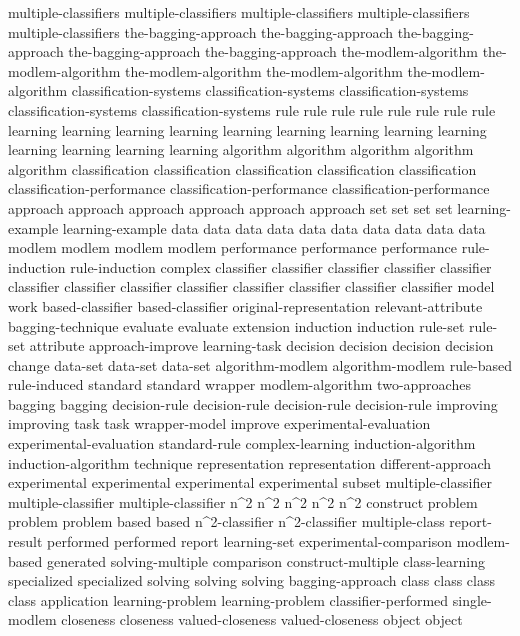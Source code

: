 multiple-classifiers	multiple-classifiers	multiple-classifiers	multiple-classifiers	multiple-classifiers	
the-bagging-approach	the-bagging-approach	the-bagging-approach	the-bagging-approach	the-bagging-approach	
the-modlem-algorithm	the-modlem-algorithm	the-modlem-algorithm	the-modlem-algorithm	the-modlem-algorithm	
classification-systems	classification-systems	classification-systems	classification-systems	classification-systems	
rule	rule	rule	rule	rule	rule	rule	rule	
learning	learning	learning	learning	learning	learning	learning	learning	learning	learning	learning	learning	learning	
algorithm	algorithm	algorithm	algorithm	algorithm	
classification	classification	classification	classification	classification	
classification-performance	classification-performance	classification-performance	
approach	approach	approach	approach	approach	approach	
set	set	set	set	
learning-example	learning-example	
data	data	data	data	data	data	data	data	data	data	
modlem	modlem	modlem	modlem	
performance	performance	performance	
rule-induction	rule-induction	
complex	
classifier	classifier	classifier	classifier	classifier	classifier	classifier	classifier	classifier	classifier	classifier	classifier	classifier	
model	
work	
based-classifier	based-classifier	
original-representation	
relevant-attribute	
bagging-technique	
evaluate	evaluate	
extension	
induction	induction	
rule-set	rule-set	
attribute	
approach-improve	
learning-task	
decision	decision	decision	decision	
change	
data-set	data-set	data-set	
algorithm-modlem	algorithm-modlem	
rule-based	
rule-induced	
standard	standard	
wrapper	
modlem-algorithm	
two-approaches	
bagging	bagging	
decision-rule	decision-rule	decision-rule	decision-rule	
improving	improving	
task	task	
wrapper-model	
improve	
experimental-evaluation	experimental-evaluation	
standard-rule	
complex-learning	
induction-algorithm	induction-algorithm	
technique	
representation	representation	
different-approach	
experimental	experimental	experimental	experimental	
subset	
multiple-classifier	multiple-classifier	multiple-classifier	
n^2	n^2	n^2	n^2	n^2	
construct	
problem	problem	problem	
based	based	
n^2-classifier	n^2-classifier	
multiple-class	
report-result	
performed	performed	
report	
learning-set	
experimental-comparison	
modlem-based	
generated	
solving-multiple	
comparison	
construct-multiple	
class-learning	
specialized	specialized	
solving	solving	solving	
bagging-approach	
class	class	class	class	
application	
learning-problem	learning-problem	
classifier-performed	
single-modlem	
closeness	closeness	
valued-closeness	valued-closeness	
object	object	
